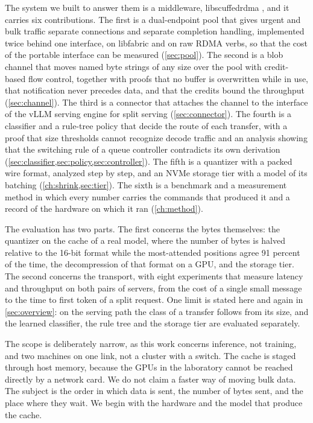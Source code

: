 The system we built to answer them is a middleware, libscuffedrdma
\citep{scuffedrdma}, and it carries six contributions. The first is a
dual-endpoint pool that gives urgent and bulk traffic separate connections
and separate completion handling, implemented twice behind one interface, on
libfabric and on raw RDMA verbs, so that the cost of the portable interface
can be measured (\cref{sec:pool}). The second is a blob channel that moves
named byte strings of any size over the pool with credit-based flow control,
together with proofs that no buffer is overwritten while in use, that
notification never precedes data, and that the credits bound the throughput
(\cref{sec:channel}). The third is a connector that attaches the channel to
the interface of the vLLM serving engine for split serving
(\cref{sec:connector}). The fourth is a classifier and a rule-tree policy
that decide the route of each transfer, with a proof that size thresholds
cannot recognize decode traffic and an analysis showing that the switching
rule of a queue controller contradicts its own derivation
(\cref{sec:classifier,sec:policy,sec:controller}). The fifth is a quantizer
with a packed wire format, analyzed step by step, and an NVMe storage tier
with a model of its batching (\cref{ch:shrink,sec:tier}). The sixth is a
benchmark and a measurement method in which every number carries the commands
that produced it and a record of the hardware on which it ran
(\cref{ch:method}).

The evaluation has two parts. The first concerns the bytes themselves: the
quantizer on the cache of a real model, where the number of bytes is halved
relative to the 16-bit format while the most-attended positions agree 91
percent of the time, the decompression of that format on a GPU, and the
storage tier. The second concerns the transport, with eight experiments that
measure latency and throughput on both pairs of servers, from the cost of a
single small message to the time to first token of a split request.  One limit is stated here and again in \cref{sec:overview}: on the serving
path the class of a transfer follows from its size, and the learned
classifier, the rule tree and the storage tier are evaluated separately.

The scope is deliberately narrow, as this work concerns inference, not
training, and two machines on one link, not a cluster with a switch. The cache is staged through host memory, because the GPUs in the
laboratory cannot be reached directly by a network card. We do not claim a
faster way of moving bulk data. The subject is the order in which data is
sent, the number of bytes sent, and the place where they wait. We begin
with the hardware and the model that produce the cache.
